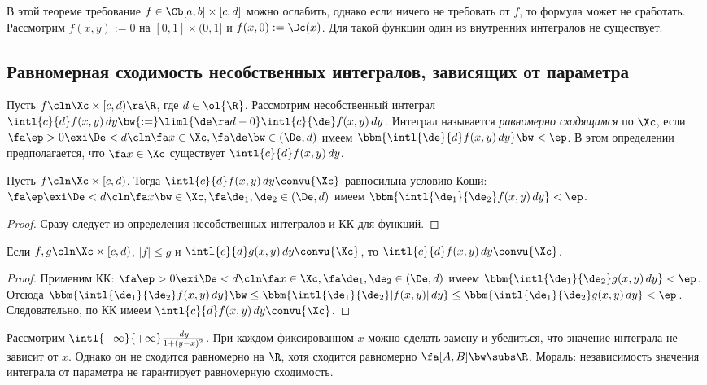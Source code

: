 \documentclass[a4paper]{article}
\begin{document}
\begin{note}
В этой теореме требование $f\in\Cb[a,b]\times[c,d]$ можно ослабить, однако если ничего
не требовать от $f$, то формула может не сработать. Рассмотрим $f(x,y):=0$ на
$[0,1]\times(0,1]$ и $f(x,0):=\Dc(x)$. Для такой функции один из внутренних интегралов не существует.
\end{note}

\subsection{Равномерная сходимость несобственных интегралов, зависящих от параметра}

\begin{df}
Пусть $f\cln\Xc\times[c,d)\ra\R$, где $d\in\ol{\R}$. Рассмотрим несобственный интеграл
$\intl{c}{d}f(x,y)\,dy\bw{:=}\liml{\de\ra d-0}\intl{c}{\de}f(x,y)\,d y$. Интеграл называется
\emph{равномерно сходящимся} по $\Xc$, если $\fa \ep >0 \exi \De < d\cln \fa x \in \Xc, \fa \de \bw\in
(\De, d)$ имеем $\bbm{\intl{\de}{d}f(x,y)\,d y} \bw< \ep$. В этом определении
предполагается, что $\fa x \in \Xc$ существует $\intl{c}{d}f(x,y)\,dy$.
\end{df}

\begin{theorem}[КК]
Пусть $f\cln\Xc\times[c,d)$. Тогда $\intl{c}{d}f(x,y)\,d y \convu{\Xc}$ равносильна условию Коши:
$\fa \ep \exi \De<d\cln \fa x \bw\in \Xc, \fa \de_1,\de_2 \in (\De,d)$ имеем
$\bbm{\intl{\de_1}{\de_2}f(x,y)\,d y} < \ep$.
\end{theorem}
\begin{proof}
Сразу следует из определения несобственных интегралов и КК для функций.
\end{proof}

\begin{theorem}
Если $f,g\cln\Xc\times[c,d)$, $|f|\le g$ и $\intl{c}{d}g(x,y)\,d y\convu{\Xc}$, то
$\intl{c}{d}f(x,y)\,d y \convu{\Xc}$.
\end{theorem}
\begin{proof}
Применим КК: $\fa \ep >0 \exi \De<d\cln \fa x \in \Xc, \fa \de_1,\de_2 \in(\De,d)$ имеем
$\bbm{\intl{\de_1}{\de_2}g(x,y)\,d y}<\ep$. Отсюда $\bbm{\intl{\de_1}{\de_2}f(x,y)\,dy}\bw\le
\bbm{\intl{\de_1}{\de_2}|f(x,y)|\,d y}\le\bbm{\intl{\de_1}{\de_2}g(x,y)\,d y}<\ep$.
Следовательно, по КК имеем $\intl{c}{d}f(x,y)\,d y \convu{\Xc}$.
\end{proof}

\begin{ex}
Рассмотрим $\intl{-\infty}{+\infty}\frac{\,d y}{1+(y-x)^2}$. При каждом фиксированном $x$ можно
сделать замену и убедиться, что значение интеграла не зависит от $x$. Однако он не сходится равномерно
на $\R$, хотя сходится равномерно $\fa [A,B] \bw\subs \R$. Мораль: независимость значения интеграла
от параметра не гарантирует равномерную сходимость.
\end{ex}
\end{document}
